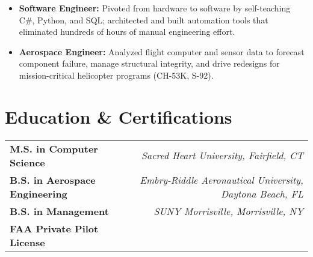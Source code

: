 \begin{itemize}
    \item \textbf{Software Engineer:} Pivoted from hardware to software by self-teaching C\#, Python, and SQL; architected and built automation tools that eliminated hundreds of hours of manual engineering effort.
    \item \textbf{Aerospace Engineer:} Analyzed flight computer and sensor data to forecast component failure, manage structural integrity, and drive redesigns for mission-critical helicopter programs (CH-53K, S-92).
\end{itemize}
\vspace{\spacingBetweenJobs}

\section*{Education \& Certifications}
\begin{tabularx}{\textwidth}{@{} >{\raggedright}X r @{}}
    \textbf{M.S. in Computer Science} & \textit{Sacred Heart University, Fairfield, CT} \\
    \textbf{B.S. in Aerospace Engineering} & \textit{Embry-Riddle Aeronautical University, Daytona Beach, FL} \\
    \textbf{B.S. in Management} & \textit{SUNY Morrisville, Morrisville, NY} \\
    \textbf{FAA Private Pilot License} & \\
\end{tabularx}